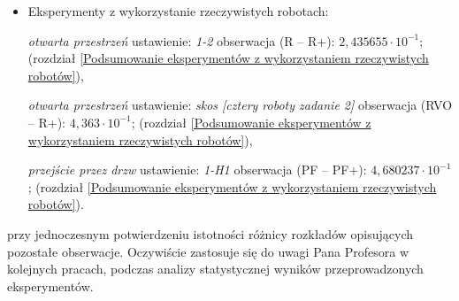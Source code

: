 \begin{frame}
{\begin{itemize}
	\subitem \textit{otwarta przestrzeń okrąg} ustawienie: \textit{dwanaście robotów}, obserwacja (RVO -- R+): $3,36788 \cdot 10^{-1}$; (rozdział \ref{Wyniki_Otwarta_przestrzen_prostopadle_Ustawienie w okrąg}),
	
	\subitem \textit{przejście przez drzwi} ustawienia: \textit{1-H1} obserwacja (R -- PF): $0,5$; (rozdział \ref{Podsumowanie_eksperymenty_symulacyjne}),
	
	\subitem \textit{przejście przez drzwi} ustawienia: \textit{H1-4} obserwacja (R+ -- PF+): $4,43920 \cdot 10^{-1}$; (rozdział \ref{Wyniki_Przejscie_przez_drzwi}),
	
	\subitem \textit{przejście przez drzwi} ustawienie: \textit{H9-8} obserwacja (R+ -- PF+): $8,60042 \cdot 10^{-2}$; (rozdział \ref{Wyniki_Przejscie_przez_drzwi}),
	
	\subitem \textit{Skrzyżowanie typu 8} ustawienie: \textit{cztery roboty} obserwacja (R -- R+): $3,035915 \cdot 10^{-1}$; (rozdział \ref{Podsumowanie_eksperymenty_symulacyjne}), 
	
	
	\item Eksperymenty z wykorzystanie rzeczywistych robotach:
	
	\subitem \textit{otwarta przestrzeń} ustawienie: \textit{1-2} obserwacja (R -- R+): $2,435655 \cdot 10^{-1}$; (rozdział \ref{Podsumowanie eksperymentów z wykorzystaniem rzeczywistych robotów}), 
	
	\subitem \textit{otwarta przestrzeń} ustawienie: \textit{skos [cztery roboty zadanie 2]} obserwacja (RVO -- R+): $4,363 \cdot 10^{-1}$; (rozdział \ref{Podsumowanie eksperymentów z wykorzystaniem rzeczywistych robotów}), 	
	
	\subitem \textit{przejście przez drzw} ustawienie: \textit{1-H1} obserwacja (PF -- PF+): $4,680237 \cdot 10^{-1}$; (rozdział \ref{Podsumowanie eksperymentów z wykorzystaniem rzeczywistych robotów}).	
\end{itemize}

przy jednoczesnym potwierdzeniu istotności różnicy rozkładów opisujących pozostałe obserwacje.
Oczywiście zastosuje się do uwagi Pana Profesora w kolejnych pracach, podczas analizy statystycznej wyników przeprowadzonych eksperymentów. 

}
\end{frame}


